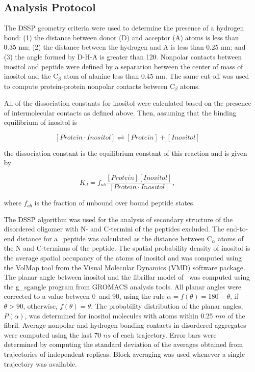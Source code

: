 \subsection{Analysis Protocol}
The DSSP geometry criteria\cite{Kabsch:1983p31} were used to determine the presence of a hydrogen bond: (1) the distance between donor (D) and acceptor (A) atoms is less than 0.35 nm; (2) the distance between the hydrogen and A is less than 0.25 nm; and (3) the angle formed by D-H-A is greater than 120\mathdeg. Nonpolar contacts between inositol and peptide were defined by a separation between the center of mass of inositol and the C$_{\beta}$ atom of alanine less than 0.45 nm. The same cut-off was used to compute protein-protein nonpolar contacts between C$_{\beta}$ atoms. 

All of the dissociation constants for inositol were calculated based on the presence of intermolecular contacts as defined above. Then, assuming that the binding equilibrium of inositol is
	
\begin{equation}
  \left[ Protein\cdot Inositol \right] 
  \rightleftharpoons 
  \left[ Protein \right]+\left[ Inositol \right]
\end{equation}
  
the dissociation constant is the equilibrium constant of this reaction and is given by 

\begin{equation}
  K_{d} = f_{ub}\frac{\left[ Protein \right]\left[ Inositol \right]}{\left[Protein \cdot Inositol\right]},
\end{equation}
 
where $f_{ub}$ is the fraction of unbound over bound peptide states.

The DSSP algorithm was used for the analysis of secondary structure of the disordered oligomer with N- and C-termini of the peptides excluded. The end-to-end distance for a \gafour\ peptide was calculated as the distance between C$_\alpha$ atoms of the N and C-terminus of the peptide. The spatial probability density of inositol is the average spatial occupancy of the atoms of inositol and was computed using the VolMap tool from the Visual Molecular Dynamics (VMD) software package. %
The planar angle between inositol and the fibrillar model of \gafour\ was computed using the g\_sgangle program from GROMACS analysis tools. All planar angles were corrected to a value between 0\mathdeg\ and 90\mathdeg, using the rule $\alpha = f(\theta) = 180 - \theta$, if $\theta > 90$\mathdeg, otherwise, $f(\theta) = \theta$. The probability distribution of the planar angles, $P(\alpha)$, was determined for inositol molecules with atoms within 0.25 $nm$ of the fibril. Average nonpolar and hydrogen bonding contacts in disordered aggregates were computed using the last 70 $ns$ of each trajectory. Error bars were determined by computing the standard deviation of the averages obtained from trajectories of independent replicas. Block averaging was used whenever a single trajectory was available.


